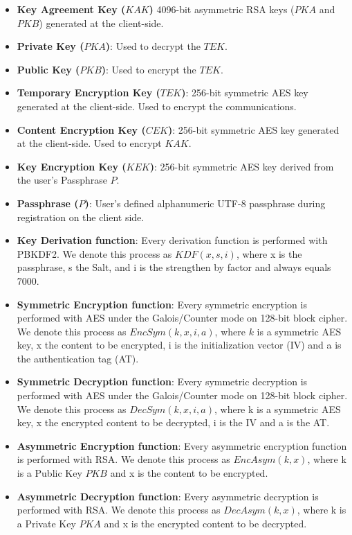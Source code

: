 \documentclass[a4paper,10pt]{article}
\begin{document}
\begin{itemize}
    \item \textbf{Key Agreement Key ($KAK$)}
    4096-bit asymmetric RSA keys ($PKA$ and $PKB$) generated at the client-side.
    \item \textbf{Private Key ($PKA$)}:
    Used to decrypt the $TEK$.
    \item \textbf{Public Key ($PKB$)}:
    Used to encrypt the $TEK$.
    \item \textbf{Temporary Encryption Key ($TEK$)}:
    256-bit symmetric AES key generated at the client-side. Used to encrypt the communications.
    \item \textbf{Content Encryption Key ($CEK$)}:
    256-bit symmetric AES key generated at the client-side. Used to encrypt $KAK$.
    \item \textbf{Key Encryption Key ($KEK$)}:
    256-bit symmetric AES key derived from the user's Passphrase $P$.
    \item \textbf{Passphrase ($P$)}:
    User's defined alphanumeric UTF-8 passphrase during registration on the client side.
    \item \textbf{Key Derivation function}:
    Every derivation function is performed with PBKDF2. We denote this process as $KDF(x, s, i)$, where x is the passphrase, s the Salt, and i is the strengthen by factor and always equals 7000.
    \item \textbf{Symmetric Encryption function}:
    Every symmetric encryption is performed with AES under the Galois/Counter mode on 128-bit block cipher. We denote this process as $EncSym(k, x, i, a)$, where $k$ is a symmetric AES key, x the content to be encrypted, i is the initialization vector (IV) and a is the authentication tag (AT).
    \item \textbf{Symmetric Decryption function}:
    Every symmetric decryption is performed with AES under the Galois/Counter mode on 128-bit block cipher. We denote this process as $DecSym(k,x,i,a)$, where k is a symmetric AES key, x the encrypted content to be decrypted, i is the IV and a is the AT.
    \item \textbf{Asymmetric Encryption function}:
    Every asymmetric encryption function is performed with RSA. We denote this process as $EncAsym(k,x)$, where k is a Public Key $PKB$ and x is the content to be encrypted.
    \item \textbf{Asymmetric Decryption function}:
    Every asymmetric decryption is performed with RSA. We denote this process as $DecAsym(k,x)$, where k is a Private Key $PKA$ and x is the encrypted content to be decrypted.
    
\end{itemize}
\end{document}
